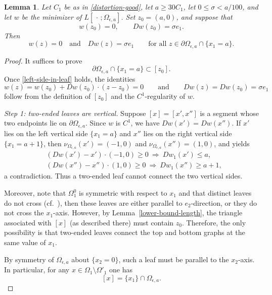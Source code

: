 \documentclass[reqno,11pt]{amsart}
\makeatletter
\newtheorem{lem}[thm]{Lemma}%
\numberwithin{equation}{section}
\theoremstyle{remark}
\makeatother
\begin{document}
\begin{lem}\label{left1}
Let $C_1$ be as in \eqref{distortion-good}, let $a\ge 30C_1$, let $0\le \sigma<a/100$, and let $w$ be the minimizer of $L[\,\cdot\,;\Omega_{\epsilon,a}]$.
Set $z_0=(a,0)$, and suppose that
\[
w(z_0)=0,
\qquad
Dw(z_0)=\sigma e_1.
\]
Then
\[
w(z)=0 \quad \text{and} \quad Dw(z)=\sigma e_1
\qquad \text{for all }z\in \partial\Omega_{\epsilon,a}\cap\{x_1=a\}.
\]
\end{lem}

\begin{proof}
It suffices to prove
\begin{equation}\label{left-side-in-leaf}
\partial\Omega_{\epsilon,a}\cap\{x_1=a\}\subset [z_0].
\end{equation}
Once \eqref{left-side-in-leaf} holds, the identities
\[
w(z)=w(z_0)+Dw(z_0)\cdot(z-z_0)=0
\qquad\text{and}\qquad
Dw(z)=Dw(z_0)=\sigma e_1
\]
follow from the definition of $[z_0]$ and the $C^1$-regularity of $w$.

\smallskip
\noindent\emph{Step 1: two-ended leaves are vertical.}
Suppose $[x]=[x',x'']$ is a segment whose two endpoints lie on $\partial\Omega_{\epsilon,a}$.
Since $w$ is $C^1$, we have $Dw(x')=Dw(x'')$.
If $x'$ lies on the left vertical side $\{x_1=a\}$ and $x''$ lies on the right vertical side $\{x_1=a+1\}$, then
$\nu_{\Omega_{\epsilon,a}}(x')=(-1,0)$ and $\nu_{\Omega_{\epsilon,a}}(x'')=(1,0)$, and
\cite[Proposition~2.3]{MRZ20252} yields
\begin{align*}
&(Dw(x')-x')\cdot(-1,0)\ge0 \ \Longrightarrow\ Dw_1(x')\le a,\\
&(Dw(x'')-x'')\cdot(1,0)\ge0 \ \Longrightarrow\ Dw_1(x'')\ge a+1,
\end{align*}
a contradiction.
Thus a two-ended leaf cannot connect the two vertical sides.

Moreover, note that $\Omega_1^0$ is symmetric with respect to $x_1$ and  that distinct leaves do not cross (cf.\ \cite{MRZ20252}), then these leaves are either parallel to $e_2$-direction, or they do not cross the $x_1$-axis. 
However, by Lemma~\ref{lower-bound-length}, the triangle associated with $[x]$ (as described there) must contain $z_0$. Therefore, the only possibility is that two-ended leaves connect the top and bottom graphs at the same value of $x_1$.

By symmetry of $\Omega_{\epsilon,a}$ about $\{x_2=0\}$, such a leaf must be parallel to the $x_2$-axis.
In particular, for any $x\in \Omega_{1}\setminus\Omega'_{1}$ one has
\begin{equation}\label{vertical-leaf}
[x]=\{x_1\}\cap \Omega_{\epsilon,a}.
\end{equation}


\end{proof}
\end{document}
